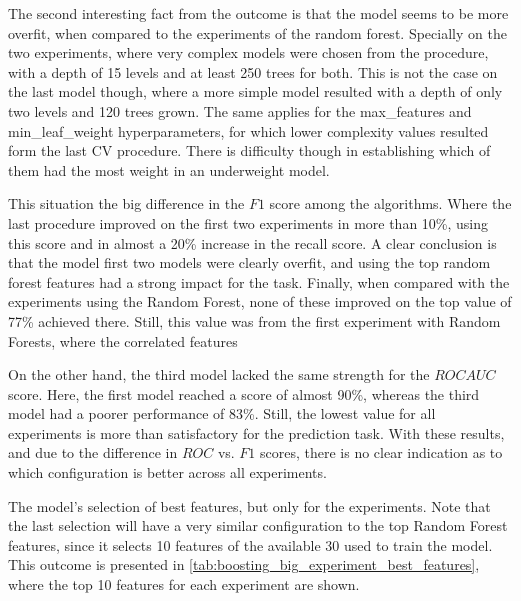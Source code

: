 The second interesting fact from the outcome is that the model seems to be more overfit, when compared to the experiments of the random forest.
Specially on the two experiments, where very complex models were chosen from the procedure, with a depth of 15 levels and at least 250 trees for both.
This is not the case on the last model though, where a more simple model resulted with a depth of only two levels and 120 trees grown.
The same applies for the max\_features and min\_leaf\_weight hyperparameters, for which lower complexity values resulted form the last CV procedure.
There is difficulty though in establishing which of them had the most weight in an underweight model.

This situation the big difference in the $F1$ score among the algorithms.
Where the last procedure improved on the first two experiments in more than 10\%, using this score and in almost a 20\% increase in the recall score.
A clear conclusion is that the model first two models were clearly overfit, and using the top random forest features had a strong impact for the task.
Finally, when compared with the experiments using the Random Forest, none of these improved on the top value of 77\% achieved there.
Still, this value was from the first experiment with Random Forests, where the correlated features


On the other hand, the third model lacked the same strength for the $ROC AUC$ score.
Here, the first model reached a score of almost 90\%, whereas the third model had a poorer performance of 83\%.
Still, the lowest value for all experiments is more than satisfactory for the prediction task.
With these results, and due to the difference in $ROC$ vs. $F1$ scores, there is no clear indication as to which configuration is better across all experiments.


The model's selection of best features, but only for the experiments.
Note that the last selection will have a very similar configuration to the top Random Forest features, since it selects 10 features of the available 30 used to train the model.
This outcome is presented in \cref{tab:boosting_big_experiment_best_features}, where the top 10 features for each experiment are shown.


